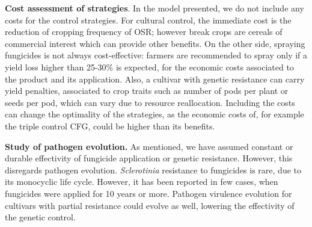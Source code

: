 \documentclass{article}
\begin{document}
\textbf{Cost assessment of strategies}. In the model presented, we do not include any costs for the control strategies. For cultural control, the immediate cost is the reduction of cropping frequency of OSR; however break crops are cereals of commercial interest which can provide other benefits. On the other side, spraying fungicides is not always cost-effective: farmers are recommended to spray only if a yield loss higher than 25-30\% is expected, for the economic costs associated to the product and its application. Also, a cultivar with genetic resistance can carry yield penalties, associated to crop traits such as number of pods per plant or seeds per pod, which can vary due to resource reallocation. Including the costs can change the optimality of the strategies, as the economic costs of, for example the triple control CFG, could be higher than its benefits.


\textbf{Study of pathogen evolution.} As mentioned, we have assumed constant or durable effectivity of fungicide application or genetic resistance. However, this disregards pathogen evolution. \textit{Sclerotinia} resistance to fungicides is rare, due to its monocyclic life cycle. However, it has been reported in few cases, when fungicides were applied for 10 years or more. Pathogen virulence evolution for cultivars with partial resistance could evolve as well, lowering the effectivity of the genetic control.  







%
\end{document}
